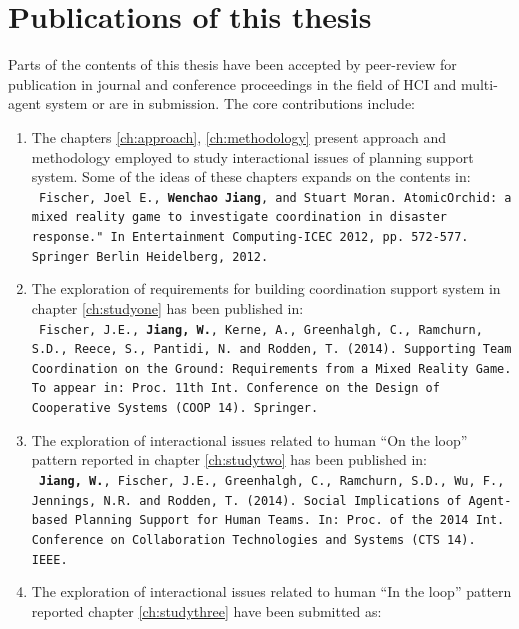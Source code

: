 \section{Publications of this thesis} 
Parts of the contents of this thesis have been accepted by peer-review for publication in journal and conference proceedings in the field of \ac{HCI} and multi-agent system or are in submission. The core contributions include: \\


\begin{enumerate}
\item The chapters \ref{ch:approach}, \ref{ch:methodology}  present approach and methodology employed to study interactional issues of planning support system. Some of the ideas of these chapters expands on the contents in:\\
\texttt{ \footnotesize Fischer, Joel E., \textbf{Wenchao Jiang}, and Stuart Moran. AtomicOrchid: a mixed reality game to investigate coordination in disaster response." In Entertainment Computing-ICEC 2012, pp. 572-577. Springer Berlin Heidelberg, 2012.}\\

\item The exploration of requirements for building coordination support system in chapter \ref{ch:studyone}  has been published in:\\
\texttt{ \footnotesize Fischer, J.E., \textbf{Jiang, W.}, Kerne, A., Greenhalgh, C., Ramchurn, S.D., Reece, S., Pantidi, N. and Rodden, T. (2014). Supporting Team Coordination on the Ground: Requirements from a Mixed Reality Game. To appear in: Proc. 11th Int. Conference on the Design of Cooperative Systems (COOP 14). Springer.}\\


\item The exploration of interactional issues related to human ``On the loop'' pattern reported in chapter \ref{ch:studytwo} has been published in:\\
\texttt{ \footnotesize\textbf{Jiang, W.}, Fischer, J.E., Greenhalgh, C., Ramchurn, S.D., Wu, F., Jennings, N.R. and Rodden, T. (2014). Social Implications of Agent-based Planning Support for Human Teams.  In: Proc. of the 2014 Int. Conference on Collaboration Technologies and Systems (CTS 14). IEEE.}

\item The exploration of interactional issues related to human ``In the loop'' pattern reported chapter \ref{ch:studythree} have been submitted as:\\



\end{enumerate}

